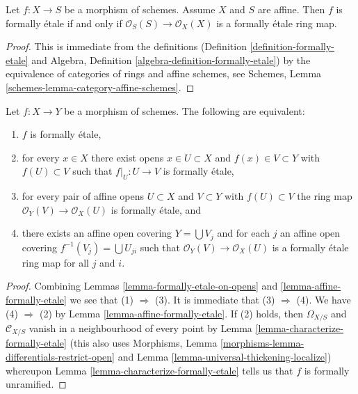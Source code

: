 \begin{lemma}
\label{lemma-affine-formally-etale}
Let $f : X \to S$ be a morphism of schemes.
Assume $X$ and $S$ are affine.
Then $f$ is formally \'etale if and only if
$\mathcal{O}_S(S) \to \mathcal{O}_X(X)$ is a formally \'etale
ring map.
\end{lemma}

\begin{proof}
This is immediate from the definitions
(Definition \ref{definition-formally-etale} and
Algebra, Definition \ref{algebra-definition-formally-etale})
by the equivalence of categories of rings and affine schemes,
see
Schemes, Lemma \ref{schemes-lemma-category-affine-schemes}.
\end{proof}

\begin{lemma}
\label{lemma-formally-etale}
Let $f : X \to Y$ be a morphism of schemes. The following are equivalent:
\begin{enumerate}
\item $f$ is formally \'etale,
\item for every $x \in X$ there exist opens $x \in U \subset X$ and
$f(x) \in V \subset Y$ with $f(U) \subset V$ such that
$f|_U : U \to V$ is formally \'etale,
\item for every pair of affine opens $U \subset X$ and $V \subset Y$
with $f(U) \subset V$ the ring map $\mathcal{O}_Y(V) \to \mathcal{O}_X(U)$
is formally \'etale, and
\item there exists an affine open covering $Y = \bigcup V_j$ and
for each $j$ an affine open covering $f^{-1}(V_j) = \bigcup U_{ji}$
such that $\mathcal{O}_Y(V) \to \mathcal{O}_X(U)$ is a formally \'etale
ring map for all $j$ and $i$.
\end{enumerate}
\end{lemma}

\begin{proof}
Combining Lemmas \ref{lemma-formally-etale-on-opens} and
\ref{lemma-affine-formally-etale} we see that (1) $\Rightarrow$ (3).
It is immediate that (3) $\Rightarrow$ (4).
We have (4) $\Rightarrow$ (2) by Lemma \ref{lemma-affine-formally-etale}.
If (2) holds, then $\Omega_{X/S}$ and $\mathcal{C}_{X/S}$ vanish
in a neighbourhood of every point by
Lemma \ref{lemma-characterize-formally-etale}
(this also uses Morphisms, Lemma
\ref{morphisms-lemma-differentials-restrict-open} and
Lemma \ref{lemma-universal-thickening-localize}) whereupon
Lemma \ref{lemma-characterize-formally-etale} tells us that $f$
is formally unramified.
\end{proof}

